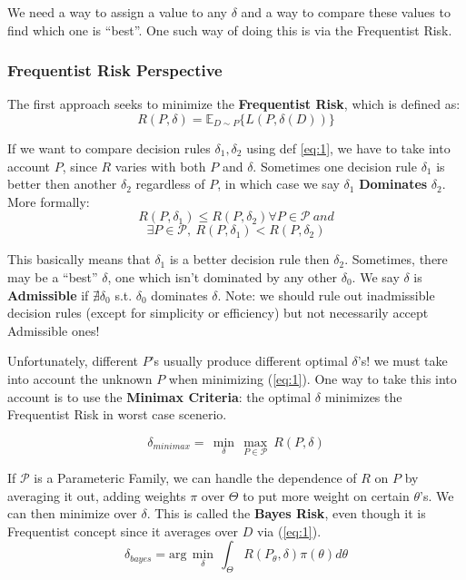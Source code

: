 \documentclass[]{article}
\theoremstyle{mattstyle}
\theoremstyle{definition}
\begin{document}
We need a way to assign a value to any \(\delta\) and a way to compare these values to find which one is ``best''. One such way of doing this is via the Frequentist Risk.

\subsubsection{Frequentist Risk Perspective} 
The first approach seeks to minimize the \textbf{Frequentist Risk}, which is defined as:
\begin{equation}\label{eq:1}
	R(P,\delta)=\mathbb{E}_{D\sim P}\{L(P,\delta(D))\}
\end{equation}

If we want to compare decision rules \(\delta_1, \delta_2\) using def \ref{eq:1}, we have to take into account \(P\), since \(R\) varies with both \(P\) and \(\delta\). Sometimes one decision rule \(\delta_1\) is better then another \(\delta_2\) regardless of \(P\), in which case we say \(\delta_1\) \textbf{Dominates} \(\delta_2\).
More formally:
$$R(P,\delta_1)\leq R(P,\delta_2) \forall P \in \mathcal{P}\ and$$
$$\exists P \in \mathcal{P},\ R(P,\delta_1) < R(P, \delta_2)$$

This basically means that \(\delta_1\) is a better decision rule then \(\delta_2\). Sometimes, there may be a ``best'' \(\delta\), one which isn't dominated by any other \(\delta_0\). We say \(\delta\) is \textbf{Admissible} if $\nexists \delta_0$ s.t. $\delta_0$ dominates $\delta$. Note: we should rule out inadmissible decision rules (except for simplicity or efficiency) but not necessarily accept Admissible ones!

Unfortunately, different \(P\)'s usually produce different optimal \(\delta\)'s! we must take into account the unknown \(P\) when minimizing (\ref{eq:1}). One way to take this into account is to use the \textbf{Minimax Criteria}: the optimal \(\delta\) minimizes the Frequentist Risk in worst case scenerio.

\begin{equation}
\delta_{minimax} = \,\min\limits_{\delta}\,\max\limits_{P \in \mathcal{P}}\ R(P,\delta)
\end{equation}

If \(\mathcal{P}\) is a Parameteric Family, we can handle the dependence of \(R\) on \(P\) by averaging it out, adding weights \(\pi\) over $\Theta$ to put more weight on certain $\theta$'s. We can then minimize over \(\delta\). This is called the \textbf{Bayes Risk}, even though it is Frequentist concept since it averages over $D$ via (\ref{eq:1}).
\begin{equation}\label{eq:3}
\delta_{bayes}= \text{arg}\,\min\limits_{\delta}\,\int_{\Theta}^{}R(P_\theta,\delta)\pi(\theta)d\theta
\end{equation}
\end{document}
